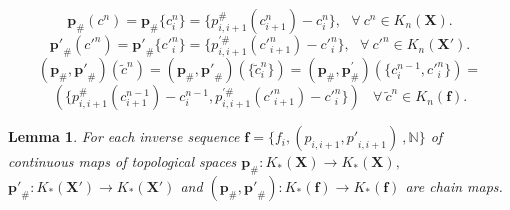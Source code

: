 \documentclass[10pt]{article}
\newtheorem{lemma}[theorem]{Lemma}
\theoremstyle{definition}
\begin{document}
$${{\mathbf{p}}_{\#}}( {{c}^{n}} )={{\mathbf{p}}_{\#}} \{c_{i}^{n} \}=\{ p_{i,i+1}^{\#}( c_{i+1}^{n} )-c_{i}^{n} \},~~~\forall ~{{c}^{n}}\in {{K}_{n}}( \mathbf{X} ).$$             
$$\mathbf{p'}_{\#}( {{c'}^{n}} )=\mathbf{p'}_{\#}\{ {c'}_{i}^{n} \}=\{ p_{i,i+1}^{'\#}( {c'}_{i+1}^{n} )-{c'}_{i}^{n} \},~~~\forall ~{{c'}^{n}}\in {{K}_{n}}( {\mathbf{{X}'}} ).$$             
	$$( {{\mathbf{p}}_{\#}},\mathbf{p'}_{\#} )( {{{\tilde{c}}}^{n}} )=( {{\mathbf{p}}_{\#}},\mathbf{p'}_{\#} )( \{ {{{\tilde{c}}}^{n}_i} \} )=( {{\mathbf{p}}_{\#}},\mathbf{p}_{\#}^{'} )( \{ c_{i}^{n-1},{c'}_{i}^{n} \} )=$$
$$( \{p_{i,i+1}^{\#}( c_{i+1}^{n-1} )-c_{i}^{n-1} , p_{i,i+1}^{'\#}( {c'}_{i+1}^{n} )-{c'}_{i}^{n} \} )  ~~~~\forall ~ {{{\tilde{c}}}^{n}} \in {{K}_{n}}( \mathbf{f} ).$$     


\begin{lemma}
For each inverse sequence $\mathbf{f}= \{ {{f}_{i}},({{p}_{i,i+1}},{p'}_{i,i+1})~,\mathbb{N} \}$ of continuous maps of topological spaces ${{\mathbf{p}}_{\#}}:{{K}_{*}}( \mathbf{X} )\to {{K}_{*}}( \mathbf{X} ),$  $\mathbf{p'}_{\#}:{{K}_{*}}( {\mathbf{{X}'}} )\to {{K}_{*}}( {\mathbf{{X}'}} )$  and $( {{\mathbf{p}}_{\#}},\mathbf{p'}_{\#} ):{{K}_{*}}( \mathbf{f} )\to {{K}_{*}}( \mathbf{f} )$ are chain maps.
\end{lemma}
\end{document}
